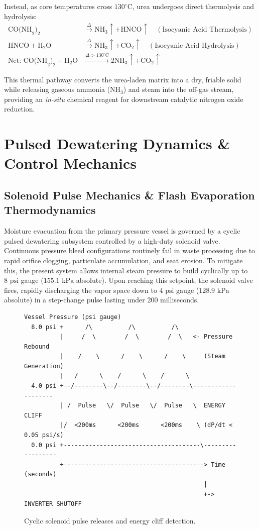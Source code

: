 \documentclass[10pt,twocolumn,a4paper]{article}
\begin{document}
Instead, as core temperatures cross $130^\circ\text{C}$, urea undergoes direct thermolysis and hydrolysis:
\begin{align}
\text{CO(NH}_2)_2 &\xrightarrow{\Delta} \text{NH}_3\uparrow + \text{HNCO}\uparrow \quad (\text{Isocyanic Acid Thermolysis}) \\
\text{HNCO} + \text{H}_2\text{O} &\xrightarrow{\Delta} \text{NH}_3\uparrow + \text{CO}_2\uparrow \quad (\text{Isocyanic Acid Hydrolysis}) \\
\text{Net: } \text{CO(NH}_2)_2 + \text{H}_2\text{O} &\xrightarrow{\Delta > 130^\circ\text{C}} 2\text{NH}_3\uparrow + \text{CO}_2\uparrow
\end{align}

This thermal pathway converts the urea-laden matrix into a dry, friable solid while releasing gaseous ammonia ($\text{NH}_3$) and steam into the off-gas stream, providing an \textit{in-situ} chemical reagent for downstream catalytic nitrogen oxide reduction.

\section{Pulsed Dewatering Dynamics \& Control Mechanics}

\subsection{Solenoid Pulse Mechanics \& Flash Evaporation Thermodynamics}

Moisture evacuation from the primary pressure vessel is governed by a cyclic pulsed dewatering subsystem controlled by a high-duty solenoid valve. Continuous pressure bleed configurations routinely fail in waste processing due to rapid orifice clogging, particulate accumulation, and seat erosion. To mitigate this, the present system allows internal steam pressure to build cyclically up to $8\text{ psi}$ gauge ($155.1\text{ kPa}$ absolute). Upon reaching this setpoint, the solenoid valve fires, rapidly discharging the vapor space down to $4\text{ psi}$ gauge ($128.9\text{ kPa}$ absolute) in a step-change pulse lasting under 200 milliseconds.

\begin{figure}[H]
\centering
\small
\begin{verbatim}
Vessel Pressure (psi gauge)
  8.0 psi +      /\          /\          /\
          |     /  \        /  \        /  \   <- Pressure Rebound
          |    /    \      /    \      /    \     (Steam Generation)
          |   /      \    /      \    /      \
  4.0 psi +--/--------\--/--------\--/--------\--------------------
          | /  Pulse   \/  Pulse   \/  Pulse   \  ENERGY CLIFF
          |/  <200ms      <200ms      <200ms    \ (dP/dt < 0.05 psi/s)
  0.0 psi +--------------------------------------\------------------
          +---------------------------------------> Time (seconds)
                                                  |
                                                  +-> INVERTER SHUTOFF
\end{verbatim}
\caption{Cyclic solenoid pulse releases and energy cliff detection.}
\label{fig:solenoid_pulses}
\end{figure}
\end{document}
